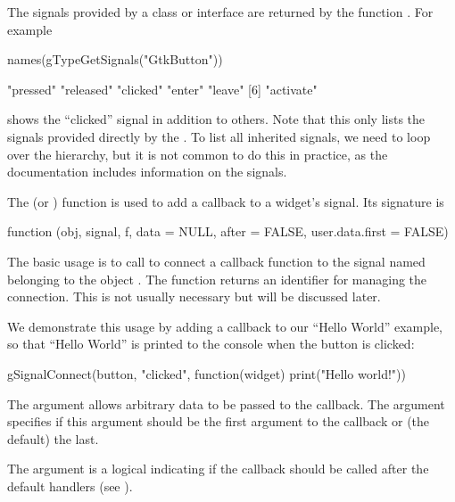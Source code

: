 The signals provided by a class or interface are returned by the
function . For example
\begin{Schunk}
\begin{Sinput}
 names(gTypeGetSignals("GtkButton"))
\end{Sinput}
\begin{Soutput}
[1] "pressed"  "released" "clicked"  "enter"    "leave"   
[6] "activate"
\end{Soutput}
\end{Schunk}
shows the ``clicked'' signal in addition to others. Note that this
only lists the signals provided directly by the . To
list all inherited signals, we need to loop over the hierarchy, but it
is not common to do this in practice, as the documentation includes
information on the signals.

The  (or ) function is used
to add a callback to a widget's signal. Its signature is
\begin{Soutput}
function (obj, signal, f, data = NULL, after = FALSE, 
          user.data.first = FALSE)
\end{Soutput}
%
The basic usage is to call  to connect a
callback function  to the signal named
 belonging to the object
. The function returns an identifier for
managing the connection. This is not usually necessary but will be
discussed later.

We demonstrate this usage by adding a callback to our ``Hello World''
example, so that ``Hello World'' is printed to the console when the
button is clicked:
\begin{Schunk}
\begin{Sinput}
 gSignalConnect(button, "clicked", 
                function(widget) print("Hello world!"))
\end{Sinput}
\end{Schunk}
%

The  argument allows arbitrary data to
be passed to the callback.  The
 argument specifies if this
 argument should be the first argument
to the callback or (the default) the last.

The  argument is a logical indicating
if the callback should be called after the default handlers (see
).


